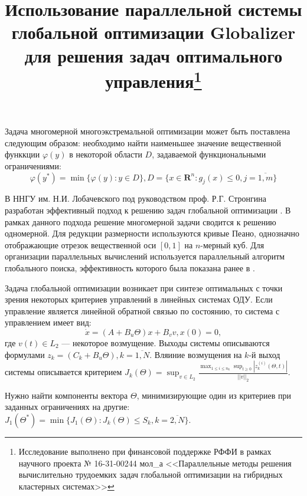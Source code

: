 \documentclass[11pt, oneside, a4paper]{article}
\begin{document}

\title{Использование параллельной системы глобальной оптимизации Globalizer для
решения задач оптимального управления\footnote{Исследование выполнено при финансовой
поддержке РФФИ в рамках научного проекта № 16-31-00244 мол\_а <<Параллельные методы
решения вычислительно трудоемких задач глобальной оптимизации на гибридных кластерных системах>>}}

\setlength{\abovedisplayskip}{3pt}
\setlength{\belowdisplayskip}{3pt}

Задача многомерной многоэкстремальной оптимизации может быть поставлена следующим образом:
необходимо найти наименьшее значение вещественной функкции \(\varphi(y)\) в некоторой области \(D\),
задаваемой функциональными ограничениями:
\begin{displaymath}
  \label{task}
    \varphi(y^*)=\min\{\varphi(y):y\in D\}, D=\{x\in \mathbf{R}^n: g_j(x) \le 0, j=\overline{1,m}\}
\end{displaymath}

В ННГУ им. Н.И. Лобачевского под руководством проф. Р.Г. Стронгина разработан
эффективный подход к решению задач глобальной оптимизации \cite{strGergrParOptBook}.
В рамках данного подхода решение многомерной задачи сводится к решению одномерной.
Для редукции размерности используются кривые Пеано, однозначно отображающие отрезок
вещественной оси \([0,1]\) на \(n\)-мерный куб. Для организации параллельных вычислений
используется параллельный алгоритм глобального поиска, эффективность которого была
показана ранее в \cite{parallelMethod}.

Задача глобальной оптимизации возникает при синтезе оптимальных с точки зрения некоторых
критериев управлений в линейных системах ОДУ. Если управление является линейной обратной
связью по состоянию, то система с управлением имеет вид:
\begin{displaymath}
    \dot x = (A+B_u\Theta)x + B_v v, x(0)=0,
\end{displaymath}
где  \(v(t)\in L_2\) --- некоторое возмущение.
Выходы системы описываются формулами \(z_k=(C_k+B_u\Theta),k=\overline{1,N}\).
Вляиние возмущения на \(k\)-й выход системы описывается критерием
\(J_k(\Theta)=\sup_{v\in L_2} \frac{\max_{1\le i \le n_k} \sup_{t\ge 0}|z_k^{(i)}(\Theta,t)|}{||v||_2}\).

Нужно найти компоненты вектора \(\Theta\), минимизирующие один из критериев при
заданных ограничениях на другие: \(J_1(\Theta^*)=\min\{J_1(\Theta):J_k(\Theta)\le S_k,k=\overline{2,N}\}\).
\end{document}
